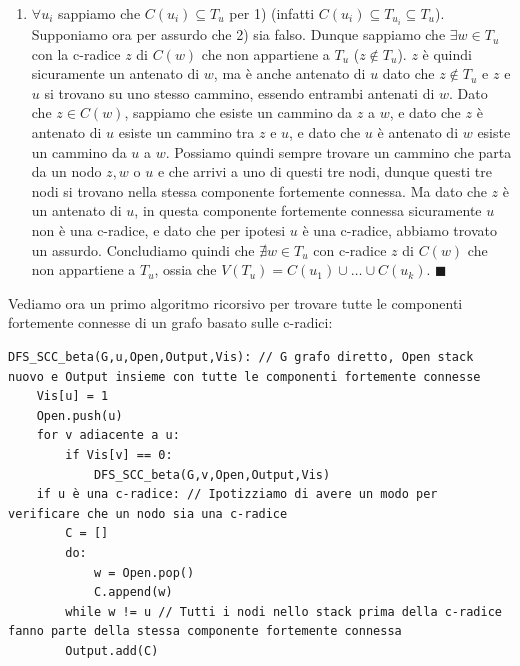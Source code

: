 \documentclass[11pt, a4paper, titlepage, oneside]{scrbook}
\begin{document}
\begin{enumerate}
\begin{itemize}
    \end{itemize}
    Dato che $(x,y)$ non è un arco né di attraversamento, né all'indietro, né in avanti concludiamo che $(x,y)$ non esiste, dunque $C(u) \subseteq T_u$. $\blacksquare$
    \item $\forall u_i$ sappiamo che $C(u_i) \subseteq T_{u}$ per 1) (infatti $C(u_i) \subseteq T_{u_i} \subseteq T_u$). Supponiamo ora per assurdo che 2) sia falso. Dunque sappiamo che $\exists w \in T_u$ con la c-radice $z$ di $C(w)$ che non appartiene a $T_u$ ($z \notin T_u$). $z$ è quindi sicuramente un antenato di $w$, ma è anche antenato di $u$ dato che $z \notin T_u$ e $z$ e $u$ si trovano su uno stesso cammino, essendo entrambi antenati di $w$. Dato che $z \in C(w)$, sappiamo che esiste un cammino da $z$ a $w$, e dato che $z$ è antenato di $u$ esiste un cammino tra $z$ e $u$, e dato che $u$ è antenato di $w$ esiste un cammino da $u$ a $w$. Possiamo quindi sempre trovare un cammino che parta da un nodo $z,w$ o $u$ e che arrivi a uno di questi tre nodi, dunque questi tre nodi si trovano nella stessa componente fortemente connessa. Ma dato che $z$ è un antenato di $u$, in questa componente fortemente connessa sicuramente $u$ non è una c-radice, e dato che per ipotesi $u$ è una c-radice, abbiamo trovato un assurdo. Concludiamo quindi che $\nexists w \in T_u$ con c-radice $z$ di $C(w)$ che non appartiene a $T_u$, ossia che $V(T_u) = C(u_1) \cup \ldots \cup C(u_k)$. $\blacksquare$
\end{enumerate}

Vediamo ora un primo algoritmo ricorsivo per trovare tutte le componenti fortemente connesse di un grafo basato sulle c-radici:

\begin{lstlisting}[style=Python]
DFS_SCC_beta(G,u,Open,Output,Vis): // G grafo diretto, Open stack nuovo e Output insieme con tutte le componenti fortemente connesse
    Vis[u] = 1
    Open.push(u)
    for v adiacente a u:
        if Vis[v] == 0:
            DFS_SCC_beta(G,v,Open,Output,Vis)
    if u è una c-radice: // Ipotizziamo di avere un modo per verificare che un nodo sia una c-radice
        C = []
        do:
            w = Open.pop()
            C.append(w)
        while w != u // Tutti i nodi nello stack prima della c-radice fanno parte della stessa componente fortemente connessa
        Output.add(C) 
\end{lstlisting}
\end{document}
